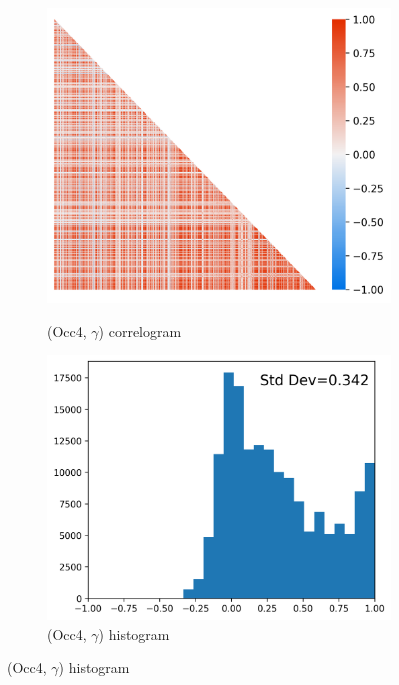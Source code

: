 \documentclass[12pt]{article}
\def\g{\gamma}
\theoremstyle{definition}
\theoremstyle{plain}
\begin{document}
\begin{figure}[!htbp]
\begin{subfigure}[b]{\w\textwidth}
		\label{fig:correlograms_hist_occ4_first_recode_sector_IBGE_sorted}
	\end{subfigure}\vfill
	\begin{subfigure}[b]{\w\textwidth}
		\centering
		\caption{(Occ4, $\g$) correlogram}
		\includegraphics[height=.25\textheight]{../Results/correlograms/correlograms_occ4_first_recode_gamma_sorted}
		\label{fig:correlograms_occ4_first_recode_gamma_sorted}
	\end{subfigure}\hfill
	\begin{subfigure}[b]{\w\textwidth}
		\centering
		\caption{(Occ4, $\g$) histogram}
		\includegraphics[height=.25\textheight]{../Results/correlograms/correlograms_hist_occ4_first_recode_gamma_sorted}

\end{subfigure}
\end{figure}
\end{document}
